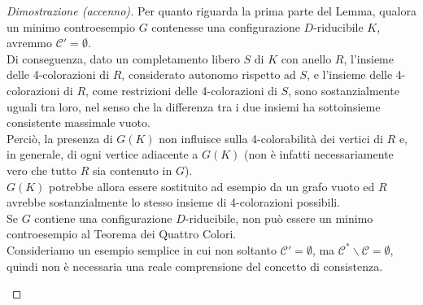\documentclass[a4paper,12pt,titlepage]{report}
\begin{document}
    \begin{proof}[Dimostrazione (accenno)]
    	Per quanto riguarda la prima parte del Lemma, qualora un minimo controesempio $G$ contenesse una configurazione $\mathit{D}$-riducibile $K$, avremmo $\mathcal{C}' = \emptyset$.
    	\\Di conseguenza, dato un completamento libero $S$ di $K$ con anello $R$, l'insieme delle 4-colorazioni di $R$, considerato autonomo rispetto ad $S$, e l'insieme delle 4-colorazioni di $R$, come restrizioni delle 4-colorazioni di $S$, sono sostanzialmente uguali tra loro, nel senso che la differenza tra i due insiemi ha sottoinsieme consistente massimale vuoto.
    	\\Perciò, la presenza di $G(K)$ non influisce sulla 4-colorabilità dei vertici di $R$ e, in generale, di ogni vertice adiacente a $G(K)$ (non è infatti necessariamente vero che tutto $R$ sia contenuto in $G$).
    	\\$G(K)$ potrebbe allora essere sostituito ad esempio da un grafo vuoto ed $R$ avrebbe sostanzialmente lo stesso insieme di 4-colorazioni possibili.
    	\\Se $G$ contiene una configurazione $\mathit{D}$-riducibile, non può essere un minimo controesempio al Teorema dei Quattro Colori.
    	\\Consideriamo un esempio semplice in cui non soltanto $\mathcal{C}' = \emptyset$, ma $\mathcal{C}^* \smallsetminus \mathcal{C} = \emptyset$, quindi non è necessaria una reale comprensione del concetto di consistenza.
    	\begin{figure}[H]
    		\centering
\end{figure}
\end{proof}
\end{document}
